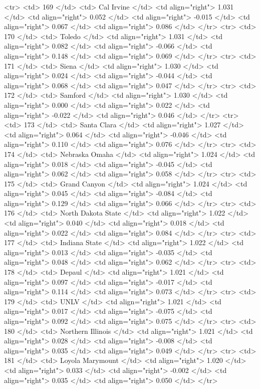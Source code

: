   <tr> <td> 169 </td> <td> Cal Irvine </td> <td align="right"> 1.031 </td> <td align="right"> 0.052 </td> <td align="right"> -0.015 </td> <td align="right"> 0.067 </td> <td align="right"> 0.086 </td> </tr>
  <tr> <td> 170 </td> <td> Toledo </td> <td align="right"> 1.031 </td> <td align="right"> 0.082 </td> <td align="right"> -0.066 </td> <td align="right"> 0.148 </td> <td align="right"> 0.069 </td> </tr>
  <tr> <td> 171 </td> <td> Siena </td> <td align="right"> 1.030 </td> <td align="right"> 0.024 </td> <td align="right"> -0.044 </td> <td align="right"> 0.068 </td> <td align="right"> 0.047 </td> </tr>
  <tr> <td> 172 </td> <td> Samford </td> <td align="right"> 1.030 </td> <td align="right"> 0.000 </td> <td align="right"> 0.022 </td> <td align="right"> -0.022 </td> <td align="right"> 0.046 </td> </tr>
  <tr> <td> 173 </td> <td> Santa Clara </td> <td align="right"> 1.027 </td> <td align="right"> 0.064 </td> <td align="right"> -0.046 </td> <td align="right"> 0.110 </td> <td align="right"> 0.076 </td> </tr>
  <tr> <td> 174 </td> <td> Nebraska Omaha </td> <td align="right"> 1.024 </td> <td align="right"> 0.018 </td> <td align="right"> -0.045 </td> <td align="right"> 0.062 </td> <td align="right"> 0.058 </td> </tr>
  <tr> <td> 175 </td> <td> Grand Canyon </td> <td align="right"> 1.024 </td> <td align="right"> 0.045 </td> <td align="right"> -0.084 </td> <td align="right"> 0.129 </td> <td align="right"> 0.066 </td> </tr>
  <tr> <td> 176 </td> <td> North Dakota State </td> <td align="right"> 1.022 </td> <td align="right"> 0.040 </td> <td align="right"> 0.018 </td> <td align="right"> 0.022 </td> <td align="right"> 0.084 </td> </tr>
  <tr> <td> 177 </td> <td> Indiana State </td> <td align="right"> 1.022 </td> <td align="right"> 0.013 </td> <td align="right"> -0.035 </td> <td align="right"> 0.048 </td> <td align="right"> 0.062 </td> </tr>
  <tr> <td> 178 </td> <td> Depaul </td> <td align="right"> 1.021 </td> <td align="right"> 0.097 </td> <td align="right"> -0.017 </td> <td align="right"> 0.114 </td> <td align="right"> 0.073 </td> </tr>
  <tr> <td> 179 </td> <td> UNLV </td> <td align="right"> 1.021 </td> <td align="right"> 0.017 </td> <td align="right"> -0.075 </td> <td align="right"> 0.092 </td> <td align="right"> 0.075 </td> </tr>
  <tr> <td> 180 </td> <td> Northern Illinois </td> <td align="right"> 1.021 </td> <td align="right"> 0.028 </td> <td align="right"> -0.008 </td> <td align="right"> 0.035 </td> <td align="right"> 0.049 </td> </tr>
  <tr> <td> 181 </td> <td> Loyola Marymount </td> <td align="right"> 1.020 </td> <td align="right"> 0.033 </td> <td align="right"> -0.002 </td> <td align="right"> 0.035 </td> <td align="right"> 0.050 </td> </tr>
